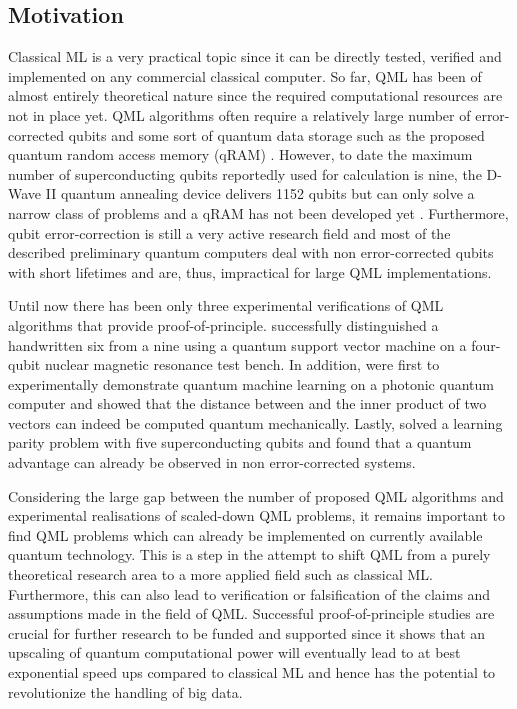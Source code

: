 \documentclass[a4paper]{article}
\newcommand*{\0}{$\ket{0}$}
\newcommand*{\1}{$\ket{1}$}
\begin{document}
\newpage

\subsection{Motivation}
\label{subsec:motivation}

Classical ML is a very practical topic since it can be directly tested, verified and implemented on any commercial classical computer. So far, QML has been of almost entirely theoretical nature since the required computational resources are not in place yet. QML algorithms often require a relatively large number of error-corrected qubits and some sort of quantum data storage such as the proposed quantum random access memory (qRAM) \citep{qRAM}. However, to date the maximum number of superconducting qubits reportedly used for calculation is nine, the D-Wave II quantum annealing device delivers 1152 qubits but can only solve a narrow class of problems and a qRAM has not been developed yet \citep{hydrogensimulation, dwave2}. Furthermore, qubit error-correction is still a very active research field and most of the described preliminary quantum computers deal with non error-corrected qubits with short lifetimes and are, thus, impractical for large QML implementations.

Until now there has been only three experimental verifications of QML algorithms that provide proof-of-principle. \cite{Li2015} successfully distinguished a handwritten six from a nine using a quantum support vector machine on a four-qubit nuclear magnetic resonance test bench. In addition, \cite{Cai2015} were first to experimentally demonstrate quantum machine learning on a photonic quantum computer and showed that the distance between and the inner product of two vectors can indeed be computed quantum mechanically. Lastly, \cite{Riste2015} solved a learning parity problem with five superconducting qubits and found that a quantum advantage can already be observed in non error-corrected systems.

Considering the large gap between the number of proposed QML algorithms and experimental realisations of scaled-down QML problems, it remains important to find QML problems which can already be implemented on currently available quantum technology. This is a step in the attempt to shift QML from a purely theoretical research area to a more applied field such as classical ML. Furthermore, this can also lead to verification or falsification of the claims and assumptions made in the field of QML. Successful proof-of-principle studies are crucial for further research to be funded and supported since it shows that an upscaling of quantum computational power will eventually lead to at best exponential speed ups compared to classical ML and hence has the potential to revolutionize the handling of big data.
\end{document}
